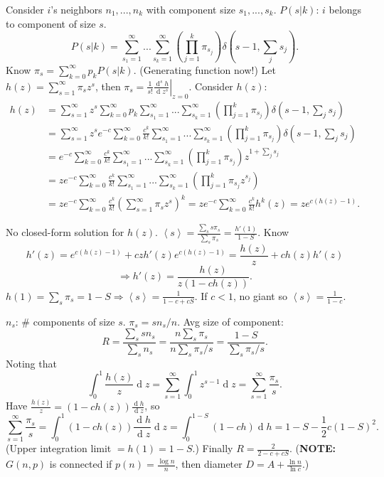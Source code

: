 \documentclass[a4paper,twocolumn,10pt]{article}
\newcommand{\ang}[1]{\left\langle {#1} \right\rangle}
\newcommand{\pte}[1]{\left({#1}\right)}
\newcommand{\op}{\operatorname}
\newcommand{\dd}{\op{d}}
\begin{document}
		Consider $i$'s neighbors $n_1,...,n_k$ with component size $s_1,...,s_k$.
		$P(s|k)$: $i$ belongs to component of size $s$.
		\[
			P(s|k)=\sum_{s_1=1}^\infty ... \sum_{s_k=1}^\infty
			\pte{\prod_{j=1}^k \pi_{s_j}} \delta(s-1,\sum_j s_j).
		\]
		Know $\pi_s = \sum_{k=0}^\infty p_k P(s|k)$.
		(Generating function now!)
		Let $h(z)=\sum_{s=1}^\infty \pi_s z^s$,
			then $\pi_s=\left. \frac{1}{s!} \frac{\dd^s h}{\dd z^s} \right|_{z=0}$.
		Consider $h(z)$:
		\[ \begin{split}
			h(z) &= \sum_{s=1}^\infty z^s \sum_{k=0}^\infty p_k
			\sum_{s_1=1}^\infty ... \sum_{s_k=1}^\infty
			\pte{\prod_{j=1}^k \pi_{s_j}} \delta(s-1,\sum_j s_j) \\
			&= \sum_{s=1}^\infty z^s e^{-c} \sum_{k=0}^\infty \frac{c^k}{k!}
			\sum_{s_1=1}^\infty ... \sum_{s_k=1}^\infty
			\pte{\prod_{j=1}^k \pi_{s_j}} \delta(s-1,\sum_j s_j) \\
			&= e^{-c} \sum_{k=0}^\infty \frac{c^k}{k!}
			\sum_{s_1=1}^\infty ... \sum_{s_k=1}^\infty
			\pte{\prod_{j=1}^k \pi_{s_j}} z^{1+\sum_j s_j} \\
			&= z e^{-c} \sum_{k=0}^\infty \frac{c^k}{k!}
			\sum_{s_1=1}^\infty ... \sum_{s_k=1}^\infty
			\pte{\prod_{j=1}^k \pi_{s_j} z^{s_j}} \\
			&= z e^{-c} \sum_{k=0}^\infty \frac{c^k}{k!}
			\pte{\sum_{s=1}^\infty \pi_{s} z^{s}}^k 
			= z e^{-c} \sum_{k=0}^\infty \frac{c^k}{k!} h^k(z) 
			= z e^{c(h(z)-1)}.
		\end{split} \]

		No closed-form solution for $h(z)$.
		$\ang{s}=\frac{\sum_s s\pi_s}{\sum_s \pi_s}=\frac{h'(1)}{1-S}$.
		Know
		\[
			h'(z)=e^{c(h(z)-1)} + czh'(z)e^{c(h(z)-1)} = \frac{h(z)}{z} + ch(z)h'(z)
		\]
		\[
			\Longrightarrow h'(z)=\frac{h(z)}{z(1-ch(z))}.
		\]
		$h(1)=\sum_s \pi_s=1-S \Longrightarrow \ang{s}=\frac{1}{1-c+cS}$.
		If $c<1$, no giant so $\ang{s}=\frac{1}{1-c}$.
	
		$n_s$: $\#$ components of size $s$. $\pi_s = s n_s/n$.
		Avg size of component: $$R=\frac{\sum_s s n_s}{\sum_s n_s}
			= \frac{n \sum_s \pi_s}{n \sum_s \pi_s / s}
			= \frac{1-S}{\sum_s \pi_s/s}.$$
		Noting that
		\[
			\int_0^1 \frac{h(z)}{z} \dd z = \sum_{s=1}^\infty \int_0^1 z^{s-1} \dd z
			= \sum_{s=1}^\infty \frac{\pi_s}{s}.
		\]
		Have $\frac{h(z)}{z} = (1-ch(z)) \frac{\dd h}{\dd z}$,
			so $$\sum_{s=1}^\infty \frac{\pi_s}{s}
			=\int_0^1 (1-ch(z)) \frac{\dd h}{\dd z} \dd z
			=\int_0^{1-S}(1-ch) \dd h = 1-S-\frac 1 2 c(1-S)^2.$$
		(Upper integration limit $ = h(1)= 1-S$.)
		Finally $R=\frac{2}{2-c+cS}$.
		(\textbf{NOTE:}
		$G(n,p)$ is connected if $p(n)=\frac{\log n}{n}$,
			then diameter $D=A+\frac{\ln n}{\ln c}$.)
\end{document}
